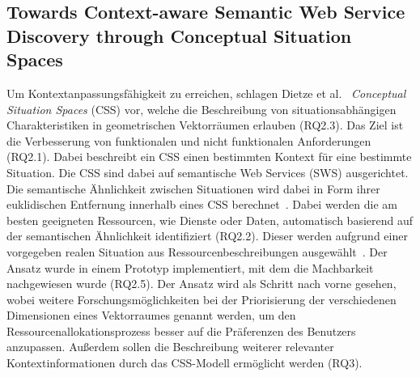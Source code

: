 \documentclass[conference,compsoc]{IEEEtran}
\begin{document}
\subsection{Towards Context-aware Semantic Web Service Discovery through Conceptual Situation Spaces}
Um Kontextanpassungsfähigkeit zu erreichen, schlagen Dietze et al.~\cite{dietze2008towards} \textit{Conceptual Situation Spaces} (CSS) vor, welche die Beschreibung von situationsabhängigen Charakteristiken in geometrischen Vektorräumen erlauben (RQ2.3). Das Ziel ist die Verbesserung von funktionalen und nicht funktionalen Anforderungen (RQ2.1). Dabei beschreibt ein CSS einen bestimmten Kontext für eine bestimmte Situation. Die CSS sind dabei auf semantische Web Services (SWS) ausgerichtet. Die semantische Ähnlichkeit zwischen Situationen wird dabei in Form ihrer euklidischen Entfernung innerhalb eines CSS berechnet~\cite{dietze2008towards}. Dabei werden die am besten geeigneten Ressourcen, wie Dienste oder Daten, automatisch basierend auf der semantischen Ähnlichkeit identifiziert (RQ2.2). Dieser werden aufgrund einer vorgegeben realen Situation aus Ressourcenbeschreibungen ausgewählt~\cite{dietze2008towards}.
Der Ansatz wurde in einem Prototyp implementiert, mit dem die Machbarkeit nachgewiesen wurde (RQ2.5).
Der Ansatz wird als Schritt nach vorne gesehen, wobei weitere Forschungsmöglichkeiten bei der Priorisierung der verschiedenen Dimensionen eines Vektorraumes genannt werden, um den Ressourcenallokationsprozess besser auf die Präferenzen des Benutzers anzupassen. Außerdem sollen die Beschreibung weiterer relevanter Kontextinformationen durch das CSS-Modell ermöglicht werden (RQ3).
\end{document}
